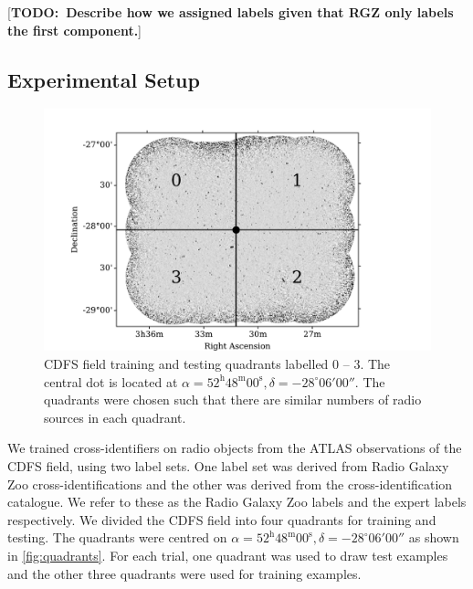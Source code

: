 \documentclass[fleqn,usenatbib,usedcolumn]{mnras}
\newcommand{\text}{\mathrm}
\newcommand{\todo}[1]{ {\color{red}[{\bf TODO:~{#1}}]} }
\begin{document}
    \todo{Describe how we assigned labels given that RGZ only labels the
    first component.}

  \subsection{Experimental Setup}
  \label{sec:experimental-setup}

    \begin{figure}
      \centering
      \includegraphics[width=\columnwidth]{images/quadrants.pdf}
      \caption{CDFS field training and testing quadrants labelled 0 -- 3. The
        central dot is located at $\alpha = 52^\text{h}48^\text{m}00^\text{s},
        \delta = -28^\circ{}06'00''$. The quadrants were chosen such that
        there are similar numbers of radio sources in each
        quadrant.\label{fig:quadrants}}
    \end{figure}

    We trained cross-identifiers on radio objects from the ATLAS observations of
    the CDFS field, using two label sets. One label set was derived from Radio
    Galaxy Zoo cross-identifications and the other was derived from the
    \citet{norris06} cross-identification catalogue. We refer to these as the
    Radio Galaxy Zoo labels and the expert labels respectively. We divided the
    CDFS field into four quadrants for training and testing. The quadrants were
    centred on $\alpha = 52^\text{h}48^\text{m}00^\text{s},
    \delta = -28^\circ{}06'00''$ as shown in \autoref{fig:quadrants}. For
    each trial, one quadrant was used to draw test examples and the other three
    quadrants were used for training examples.
\end{document}
